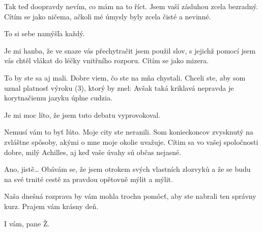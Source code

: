 \documentclass[12pt]{article}
\begin{document}
\begin{description}[itemsep=0pt]
\item[A:] Tak teď doopravdy nevím, co mám na to říct. Jsem vaší zásluhou
    zcela bezradný. Cítím se jako ničema, ačkoli mé úmysly byly zcela čisté
    a nevinné.

\item[Ž:] To si sebe namýšľa každý.

\item[A:] Je mi hanba, že ve snaze vás přechytračit jsem použil slov, s jejichž
    pomocí jsem vás chtěl vlákat do léčky vnitřního rozporu. Cítím se jako mizera.

\item[Ž:] To by ste sa aj mali. Dobre viem, čo ste na mňa chystali. Chceli ste, aby som uznal platnosť výroku (3), ktorý by znel:  Avšak taká kriklavá nepravda je korytnačiemu jazyku úplne cudzia. 

\item[A:] Je mi moc líto, že jsem tuto debatu vyprovokoval.

\item[Ž:] Nemusí vám to byť ľúto. Moje city ste neranili. Som konieckoncov zvysknutý na zvláštne spôsoby, akými o mne moje okolie uvažuje. Cítim sa vo vašej spoločnosti dobre, milý Achilles, aj keď vaše úvahy sú občas nejasné.

\item[A:] Ano, jistě… Obávám se, že jsem otrokem svých vlastních zlozvyků a že
    se budu na své trnité cestě za pravdou opětovně mýlit a mýlit.

\item[Ž:] Naša dnešná rozprava by vám mohla trochu pomôcť, aby ste nabrali ten správny kurz. Prajem vám krásny deň.

\item[A:] I vám, pane Ž.
\end{description}
\end{document}
